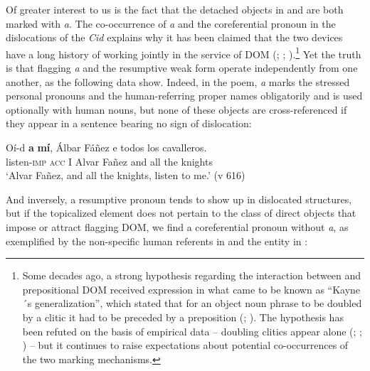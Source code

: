 \documentclass[output=paper]{LSP/langsci}
\begin{document}
Of greater interest to us is the fact that the detached objects in  and  are both marked with \textit{a.} The co-occurrence of \textit{a} and the coreferential pronoun in the dislocations of the \textit{Cid} explains why it has been claimed that the two devices have a long history of working jointly in the service of  DOM (\citealt{Laca1995Acusativo}; \citealt{Melis1995Objetodirecto}; \citealt{Leonetti2004Specificity,Leonetti2008Specificity}).\footnote{Some decades ago, a strong hypothesis regarding the interaction between  and prepositional DOM received expression in what came to be known as “Kayne´s generalization”, which stated that for an object noun phrase to be doubled by a clitic it had to be preceded by a preposition (\citealt{Kayne1975French}; \citealt{Jaeggli1982Topics}). The hypothesis has been refuted on the basis of empirical data – doubling clitics appear alone (\citealt{Suner1988Agreement}; \citealt{Anagnostopoulou1999Conditions}; \citealt{Leonetti2008Specificity}) – but it continues to raise expectations about potential co-occurrences of the two marking mechanisms.} Yet the truth is that flagging \textit{a} and the resumptive weak form operate independently from one another, as the following data show. Indeed, in the poem, \textit{a} marks the stressed personal pronouns and the human-referring proper names obligatorily and is used optionally with human  nouns, but none of these objects are cross-referenced if they appear in a sentence bearing no sign of dislocation:

\begin{exe}
\ex%
\label{04-me-ex:6}
\gll Oí-d \textbf{a} \textbf{mí}, Álbar Fáñez {\textbar} e todos los cavalleros.\\
 listen-\textsc{imp} \textsc{acc} I Alvar Fañez { } and all the knights\\
\glt ‘Alvar Fañez, and all the knights, listen to me.’ (v 616)
\end{exe}
 
And inversely, a resumptive pronoun tends to show up in dislocated structures, but if the topicalized element does not pertain to the class of direct objects that impose or attract flagging DOM, we find a coreferential pronoun without \textit{a}, as exemplified by the non-specific human referents in  and the  entity in :
\end{document}
